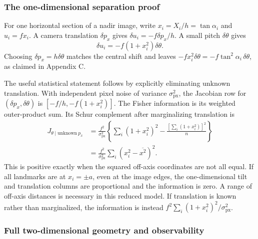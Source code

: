 \documentclass[11pt,a4paper]{article}
\numberwithin{equation}{section}
\begin{document}
\subsubsection{The one-dimensional separation proof}

For one horizontal section of a nadir image, write
$x_i=X_i/h=\tan\alpha_i$ and $u_i=f x_i$. A camera translation
$\delta p_x$ gives $\delta u_i=-f\delta p_x/h$. A small pitch
$\delta\theta$ gives
\begin{equation}
 \delta u_i=-f(1+x_i^2)\delta\theta.
\end{equation}
Choosing $\delta p_x=h\delta\theta$ matches the central shift and leaves
$-f x_i^2\delta\theta=-f\tan^2\alpha_i\,\delta\theta$, as claimed in
Appendix C.

The useful statistical statement follows by explicitly eliminating
unknown translation. With independent pixel noise of variance
$\sigma_{\mathrm{px}}^2$, the Jacobian row for
$(\delta p_x,\delta\theta)$ is
$[-f/h,-f(1+x_i^2)]$. The Fisher information is its weighted outer-product
sum. Its Schur complement after marginalizing translation is
\begin{align}
 J_{\theta\mid\mathrm{unknown}\ p_x}
 &=\frac{f^2}{\sigma_{\mathrm{px}}^2}
   \left\{\sum_i(1+x_i^2)^2-
                    \frac{[\sum_i(1+x_i^2)]^2}{n}\right\}\\
 &=\frac{f^2}{\sigma_{\mathrm{px}}^2}
                  \sum_i(x_i^2-\overline{x^2})^2.
 \label{eq:tilt-information}
\end{align}
This is positive exactly when the squared off-axis coordinates are not
all equal. If all landmarks are at $x_i=\pm a$, even at the image edges,
the one-dimensional tilt and translation columns are proportional and
the information is zero. A range of off-axis distances is necessary in
this reduced model. If translation is known rather than marginalized,
the information is instead
$f^2\sum_i(1+x_i^2)^2/\sigma_{\mathrm{px}}^2$.

\subsubsection{Full two-dimensional geometry and observability}
\end{document}
